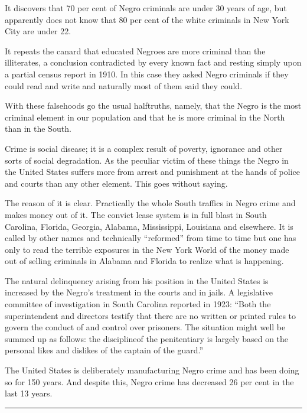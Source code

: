 \documentclass[letterpaper,10pt,english]{jupyterBook}
\begin{document}
\sphinxAtStartPar
It discovers that 70 per cent of Negro criminals are under 30 years of age, but apparently does not know that 80 per cent of the white criminals in New York City are under 22.

\sphinxAtStartPar
It repeats the canard that educated Negroes are more criminal than the illiterates, a conclusion contradicted by every known fact and resting simply upon a partial census report in 1910. In this case they asked Negro criminals if they could read and write and naturally most of them said they could.

\sphinxAtStartPar
With these falsehoods go the usual half\sphinxhyphen{}truths, namely, that the Negro is the most criminal element in our population and that he is more criminal in the North than in the South.

\sphinxAtStartPar
Crime is social disease; it is a complex result of poverty, ignorance and other sorts of social degradation. As the peculiar victim of these things the Negro in the United States suffers more from arrest and punishment at the hands of police and courts than any other element. This goes without saying.

\sphinxAtStartPar
The reason of it is clear. Practically the whole South traffics in Negro crime and makes money out of it. The convict lease system is in full blast in South Carolina, Florida, Georgia, Alabama, Mississippi, Louisiana and elsewhere. It is called by other names and technically “reformed” from time to time but one has only to read the terrible exposures in the New York World of the money made out of selling criminals in Alabama and Florida to realize what is happening.

\sphinxAtStartPar
The natural delinquency arising from his position in the United States is increased by the Negro’s treatment in the courts and in jails. A legislative committee of investigation in South Carolina reported in 1923: “Both the superintendent and directors testify that there are no written or printed rules to govern the conduct of and control over prisoners. The situation might well be summed up as follows: the discipline\sphinxhyphen{}of the penitentiary is largely based on the personal likes and dislikes of the captain of the guard.”

\sphinxAtStartPar
The United States is deliberately manufacturing Negro crime and has been doing so for 150 years. And despite this, Negro crime has decreased 26 per cent in the last 13 years.


\bigskip\hrule\bigskip
\end{document}
